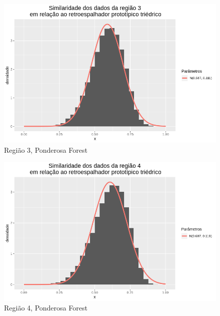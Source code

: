 \documentclass[12pt]{article}
\begin{document}
\begin{figure}[!h]
    \centering
    \vspace{0.1\linewidth}
    \includegraphics[width = \linewidth]{../../Images/Report_18_12_20/ponder_tri_region3.png}
    \caption{Região 3, Ponderosa Forest}
    \label{fig:pond_tri_r3}
\end{figure}

\begin{figure}[!h]
    \centering
    \vspace{0.1\linewidth}
    \includegraphics[width = \linewidth]{../../Images/Report_18_12_20/ponder_tri_region4.png}
    \caption{Região 4, Ponderosa Forest}
    \label{fig:pond_tri_r4}
\end{figure}
\end{document}
